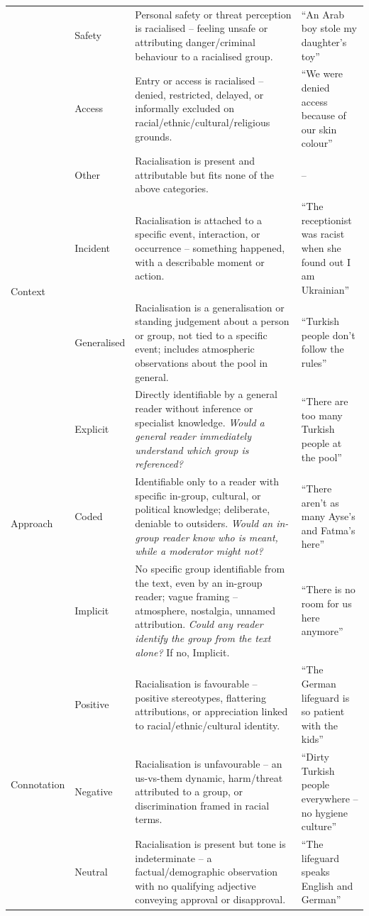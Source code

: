 \begin{table}[htbp]
\begin{tabular}{@{} l l p{} p{} @{}}
 & Safety & Personal safety or threat perception is racialised -- feeling unsafe or attributing danger/criminal behaviour to a racialised group. & ``An Arab boy stole my daughter's toy'' \\
 & Access & Entry or access is racialised -- denied, restricted, delayed, or informally excluded on racial/ethnic/cultural/religious grounds. & ``We were denied access because of our skin colour'' \\
 & Other & Racialisation is present and attributable but fits none of the above categories. & -- \\
\midrule
\multirow[t]{2}{*}{Context} & Incident & Racialisation is attached to a specific event, interaction, or occurrence -- something happened, with a describable moment or action. & ``The receptionist was racist when she found out I am Ukrainian'' \\
 & Generalised & Racialisation is a generalisation or standing judgement about a person or group, not tied to a specific event; includes atmospheric observations about the pool in general. & ``Turkish people don't follow the rules'' \\
\midrule
\multirow[t]{3}{*}{Approach} & Explicit & Directly identifiable by a general reader without inference or specialist knowledge. \emph{Would a general reader immediately understand which group is referenced?} & ``There are too many Turkish people at the pool'' \\
 & Coded & Identifiable only to a reader with specific in-group, cultural, or political knowledge; deliberate, deniable to outsiders. \emph{Would an in-group reader know who is meant, while a moderator might not?} & ``There aren't as many Ayse's and Fatma's here'' \\
 & Implicit & No specific group identifiable from the text, even by an in-group reader; vague framing -- atmosphere, nostalgia, unnamed attribution. \emph{Could any reader identify the group from the text alone?} If no, Implicit. & ``There is no room for us here anymore'' \\
\midrule
\multirow[t]{3}{*}{Connotation} & Positive & Racialisation is favourable -- positive stereotypes, flattering attributions, or appreciation linked to racial/ethnic/cultural identity. & ``The German lifeguard is so patient with the kids'' \\
 & Negative & Racialisation is unfavourable -- an us-vs-them dynamic, harm/threat attributed to a group, or discrimination framed in racial terms. & ``Dirty Turkish people everywhere -- no hygiene culture'' \\
 & Neutral & Racialisation is present but tone is indeterminate -- a factual/demographic observation with no qualifying adjective conveying approval or disapproval. & ``The lifeguard speaks English and German'' \\
\bottomrule
\end{tabular}
\end{table}
